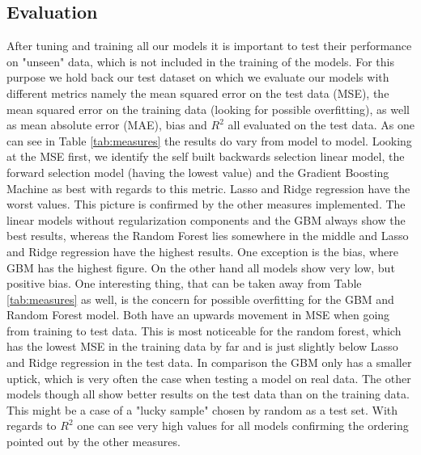 \subsection{Evaluation}
After tuning and training all our models it is important to test their performance on "unseen" data, which is not included in the training of the models. For this purpose we hold back our test dataset on which we evaluate our models with different metrics namely the mean squared error on the test data (MSE), the mean squared error on the training data (looking for possible overfitting),  as well as  mean absolute error (MAE), bias and  $R^2$ all evaluated on the test data. As one can see in Table \ref{tab:measures} the results do vary from model to model. Looking at the MSE first, we identify the self built backwards selection linear model, the forward selection model (having the lowest value) and the Gradient Boosting Machine as best with regards to this metric. Lasso and Ridge regression have the worst values. This picture is confirmed by the other measures implemented. The linear models without regularization components and the GBM always show the best results, whereas the Random Forest lies somewhere in the middle and Lasso and Ridge regression have the highest results. One exception is the bias, where GBM has the highest figure. On the other hand all models show very low, but positive bias. One interesting thing, that can be taken away from Table \ref{tab:measures} as well, is the concern for possible overfitting for the GBM and Random Forest model.
Both have an upwards movement in MSE when going from training to test data. This is most noticeable for the random forest, which has the lowest MSE in the training data by far and is just slightly below Lasso and Ridge regression in the test data. In comparison the GBM only has a smaller uptick, which is very often the case when testing a model on real data. The other models though all show better results on the test data than on the training data. This might be a case of a "lucky sample" chosen by random as a test set. With regards to $R^2$ one can see very high values for all models confirming the ordering pointed out by the other measures. 





